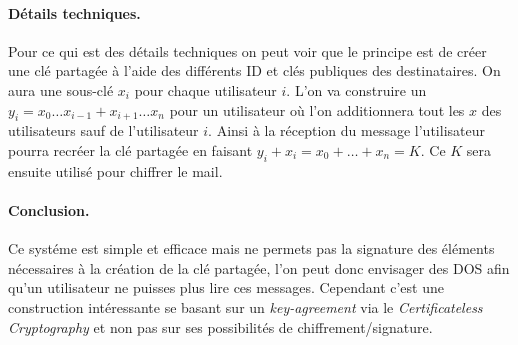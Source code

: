 \paragraph*{Détails techniques.} Pour ce qui est des détails techniques on peut voir que le principe est de créer une clé partagée à l'aide des différents ID et clés publiques des destinataires. On aura une sous-clé $x_i$ pour chaque utilisateur $i$. L'on va construire un $y_i = x_0 \dots x_{i-1} + x_{i+1} \dots x_n$ pour un utilisateur où l'on additionnera tout les $x$ des utilisateurs sauf de l'utilisateur $i$. Ainsi à la réception du message l'utilisateur pourra recréer la clé partagée en faisant $y_i + x_i = x_0 + \dots + x_n = K$. Ce $K$ sera ensuite utilisé pour chiffrer le mail.
\paragraph*{Conclusion.} Ce systéme est simple et efficace mais ne permets pas la signature des éléments nécessaires à la création de la clé partagée, l'on peut donc envisager des DOS afin qu'un utilisateur ne puisses plus lire ces messages. Cependant c'est une construction intéressante se basant sur un \textit{key-agreement} via le \textit{Certificateless Cryptography} et non pas sur ses possibilités de chiffrement/signature.



